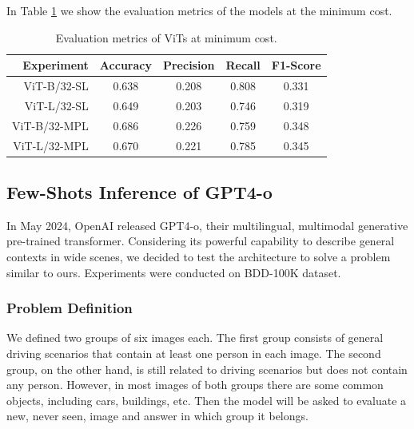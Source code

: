 In Table \ref{tab:cost_metrics} we show the evaluation metrics of the models at 
the minimum cost.

\begin{table}[h]
    \vspace{0.3cm}
    \centering
    \begin{tabular}{rcccc}
    \hline
    \textbf{Experiment} & \textbf{Accuracy} & \textbf{Precision} & \textbf{Recall} & \textbf{F1-Score} \\ \hline\hline
    ViT-B/32-SL & 0.638 & 0.208 & 0.808 & 0.331 \\\hline
    ViT-L/32-SL & 0.649 & 0.203 & 0.746 & 0.319 \\\hline
    ViT-B/32-MPL & 0.686 & 0.226 & 0.759 & 0.348 \\\hline
    ViT-L/32-MPL & 0.670 & 0.221 & 0.785 & 0.345 \\\hline
    \end{tabular}
    \caption[Evaluation metrics of ViTs at minimum cost.]
    {Evaluation metrics of ViTs at minimum cost.}
    \label{tab:cost_metrics}
\end{table}

\subsection{Few-Shots Inference of GPT4-o}
In May 2024, OpenAI released GPT4-o, their multilingual, multimodal generative 
pre-trained transformer. Considering its powerful capability to describe general 
contexts in wide scenes, we decided to test the architecture to solve a problem 
similar to ours. Experiments were conducted on BDD-100K dataset.

\subsubsection{Problem Definition}
We defined two groups of six images each. The first group consists of general 
driving scenarios that contain at least one person in each image. 
The second group, on the other hand, is still related to driving scenarios but 
does not contain any person. However, in most images of both groups there are 
some common objects, including cars, buildings, etc.
Then the model will be asked to evaluate a new, never seen, image and answer 
in which group it belongs.

